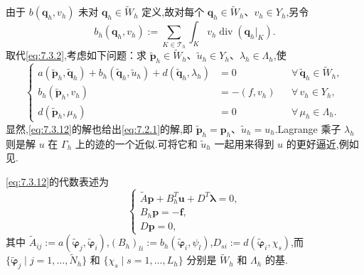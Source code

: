 \begin{example}
由于 \(b(\boldsymbol{q}_h,v_h)\) 未对 \(\boldsymbol{q}_h\in\widetilde W_h\) 定义,故对每个 \(\boldsymbol{q}_h\in\widetilde W_h\)、\(v_h\in Y_h\),另令
\begin{equation}\label{eq:7.3.11}
  b_h(\boldsymbol{q}_h,v_h):=\sum_{K\in\mathcal T_h}\int_K v_h\operatorname{div}(\boldsymbol{q}_h|_K).
\end{equation}
取代\eqref{eq:7.3.2},考虑如下问题：求 \(\widetilde{\boldsymbol{p}}_h\in\widetilde W_h\)、\(\widetilde u_h\in Y_h\)、\(\lambda_h\in\Lambda_h\),使
\begin{equation}\label{eq:7.3.12}
  \left\{
  \begin{aligned}
    a(\widetilde{\boldsymbol{p}}_h,\widetilde{\boldsymbol{q}}_h)
        +b_h(\widetilde{\boldsymbol{q}}_h,\widetilde u_h)+d(\widetilde{\boldsymbol{q}}_h,\lambda_h)
          &=0 &&\forall\,\widetilde{\boldsymbol{q}}_h\in\widetilde W_h,\\
    b_h(\widetilde{\boldsymbol{p}}_h,v_h)&=-(f,v_h)&&\forall\,v_h\in Y_h,\\
    d(\widetilde{\boldsymbol{p}}_h,\mu_h)&=0&&\forall\,\mu_h\in\Lambda_h.
  \end{aligned}
  \right.
\end{equation}
显然,\eqref{eq:7.3.12}的解也给出\eqref{eq:7.2.1}的解,即 \(\widetilde{\boldsymbol{p}}_h=\boldsymbol{p}_h\)、\(\widetilde u_h=u_h\).Lagrange 乘子 \(\lambda_h\) 则是解 \(u\) 在 \(\Gamma_h\) 上的迹的一个近似.可将它和 \(\widetilde u_h\) 一起用来得到 \(u\) 的更好逼近,例如见.

\eqref{eq:7.3.12}的代数表述为
\begin{equation}\label{eq:7.3.13}
  \begin{cases}
    \widetilde A\boldsymbol{p}+B_h^T\boldsymbol{u}+D^T\boldsymbol{\lambda}=0,\\
    B_h\boldsymbol{p}=-\boldsymbol{f},\\
    D\boldsymbol{p}=0,
  \end{cases}
\end{equation}
其中 \(\widetilde A_{ij}:=a(\widetilde{\boldsymbol{\varphi}}_j,\widetilde{\boldsymbol{\varphi}}_i)\),\((B_h)_{li}:=b_h(\widetilde{\boldsymbol{\varphi}}_i,\psi_l)\),\(D_{si}:=d(\widetilde{\boldsymbol{\varphi}}_i,\chi_s)\),而 \(\{\widetilde{\boldsymbol{\varphi}}_j\mid j=1,\ldots,\widetilde N_h\}\) 和 \(\{\chi_s\mid s=1,\ldots,L_h\}\) 分别是 \(\widetilde W_h\) 和 \(\Lambda_h\) 的基.


\end{example}
